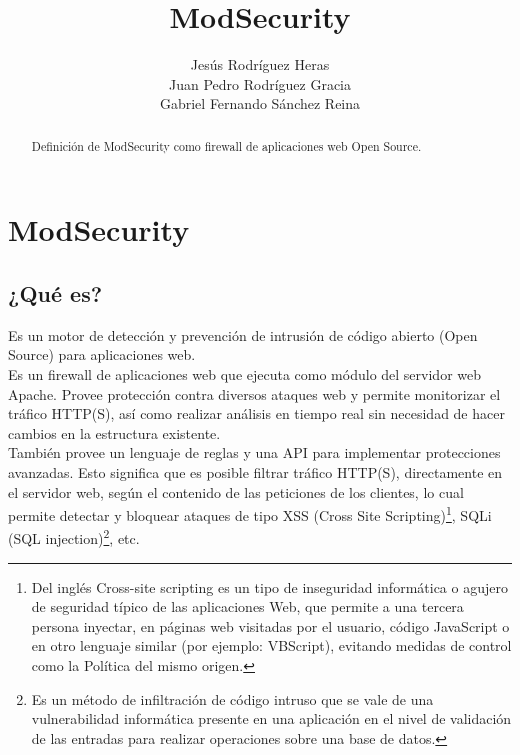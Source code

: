 \documentclass[12pt,letterpaper]{article}
\title{ModSecurity}
\author{Jesús Rodríguez Heras\\Juan Pedro Rodríguez Gracia\\Gabriel Fernando Sánchez Reina}
\begin{document}
	
	\maketitle
	\begin{abstract} %
		\begin{center}
			Definición de ModSecurity como firewall de aplicaciones web Open Source.
		\end{center}
	\end{abstract}
	\thispagestyle{empty}
	\newpage
	
	\tableofcontents
	\newpage
	
	
	
	
	\lstset{language=bash, numbers=left, numberstyle=\tiny, numbersep=10pt, firstnumber=1, stepnumber=1, basicstyle=\small\ttfamily, tabsize=1, extendedchars=true, inputencoding=latin1}


\section{ModSecurity}
\subsection{¿Qué es?}
Es un motor de detección y prevención de intrusión de código abierto (Open Source) para aplicaciones web.\\

Es un firewall de aplicaciones web que ejecuta como módulo del servidor web Apache. Provee protección contra diversos ataques web y permite monitorizar el tráfico HTTP(S), así como realizar análisis en tiempo real sin necesidad de hacer cambios en la estructura existente.\\

También provee un lenguaje de reglas y una API para implementar protecciones avanzadas. Esto significa que es posible filtrar tráfico HTTP(S), directamente en el servidor web, según el contenido de las peticiones de los clientes, lo cual permite detectar y bloquear ataques de tipo XSS (Cross Site Scripting)\footnote{Del inglés Cross-site scripting es un tipo de inseguridad informática o agujero de seguridad típico de las aplicaciones Web, que permite a una tercera persona inyectar, en páginas web visitadas por el usuario, código JavaScript o en otro lenguaje similar (por ejemplo: VBScript), evitando medidas de control como la Política del mismo origen.}, SQLi (SQL injection)\footnote{Es un método de infiltración de código intruso que se vale de una vulnerabilidad informática presente en una aplicación en el nivel de validación de las entradas para realizar operaciones sobre una base de datos.}, etc.\\
\end{document}
